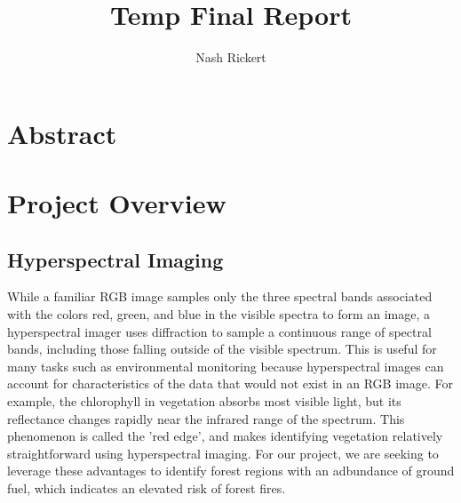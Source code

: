 \documentclass{article}
\title{Temp Final Report}
\author{Nash Rickert}
\begin{document}
\maketitle

\section{Abstract}

\section{Project Overview}
\subsection{Hyperspectral Imaging}
While a familiar RGB image samples only the three spectral bands associated with the colors red, green, and blue in the visible spectra to form an image, a hyperspectral imager uses diffraction to sample a continuous range of spectral bands, including those falling outside of the visible spectrum. This is useful for many tasks such as environmental monitoring because hyperspectral images can account for characteristics of the data that would not exist in an RGB image. For example, the chlorophyll in vegetation absorbs most visible light, but its reflectance changes rapidly near the infrared range of the spectrum. This phenomenon is called the 'red edge', and makes identifying vegetation relatively straightforward using hyperspectral imaging. For our project, we are seeking to leverage these advantages to identify forest regions with an adbundance of ground fuel, which indicates an elevated risk of forest fires.
\end{document}
